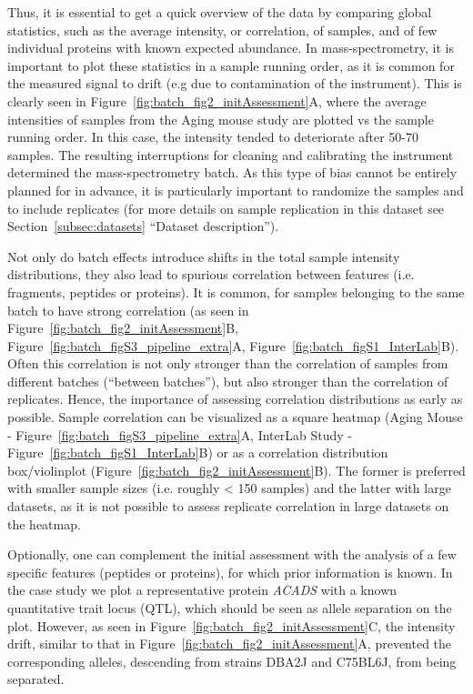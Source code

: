 \documentclass[num-refs]{wiley-article}
\begin{document}
Thus, it is essential to get a quick overview of the data by comparing global statistics, such as the average intensity, or correlation, of samples, and of few individual proteins with known expected abundance. In mass-spectrometry, it is important to plot these statistics in a sample running order, as it is common for the measured signal to drift (e.g  due to contamination of the instrument). This is clearly seen in Figure~\ref{fig:batch_fig2_initAssessment}A, where the average intensities of samples from the Aging mouse study are plotted vs the sample running order. In this case, the intensity tended to deteriorate after 50-70 samples. The resulting interruptions for cleaning and calibrating the instrument determined the mass-spectrometry batch. As this type of bias cannot be entirely planned for in advance, it is particularly important to randomize the samples and to include replicates (for more details on sample replication in this dataset see Section~\ref{subsec:datasets} “Dataset description”). 

Not only do batch effects introduce shifts in the total sample intensity distributions, they also lead to spurious correlation between features (i.e. fragments, peptides or proteins). It is common, for samples belonging to the same batch to have strong correlation (as seen in Figure~\ref{fig:batch_fig2_initAssessment}B, Figure~\ref{fig:batch_figS3_pipeline_extra}A, Figure~\ref{fig:batch_figS1_InterLab}B). Often this correlation is not only stronger than the correlation of samples from different batches (“between batches”), but also stronger than the correlation of replicates. Hence, the importance of assessing correlation distributions as early as possible. Sample correlation can be visualized as a square heatmap (Aging Mouse - Figure~\ref{fig:batch_figS3_pipeline_extra}A, InterLab Study -  Figure~\ref{fig:batch_figS1_InterLab}B) or as a correlation distribution box/violinplot (Figure~\ref{fig:batch_fig2_initAssessment}B). The former is preferred with smaller sample sizes (i.e. roughly < 150 samples) and the latter with large datasets, as it is not possible to assess replicate correlation in large datasets on the heatmap.

Optionally, one can complement the initial assessment with the analysis of a few specific features (peptides or proteins), for which prior information is known. In the case study we plot a representative protein \textit{ACADS} with a known quantitative trait locus (QTL), which should be seen as allele separation on the plot. However, as seen in Figure~\ref{fig:batch_fig2_initAssessment}C, the intensity drift, similar to that in Figure~\ref{fig:batch_fig2_initAssessment}A,  prevented the corresponding alleles, descending from strains DBA2J and C75BL6J,  from being separated.
\end{document}
